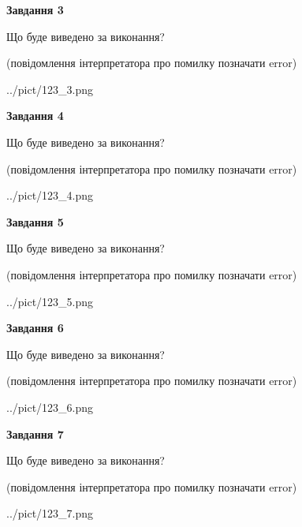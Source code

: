 \documentclass[12pt, ukrainian]{article}
\begin{document}
{\begin {large}
{\begin {center}\textbf{Завдання 3}\end {center}}\par
Що буде виведено за виконання?\par
 (повідомлення інтерпретатора про помилку позначати error)\par
\begin{center}
	{../pict/123_3.png}
\end{center}
\newpage

{\begin {center}\textbf{Завдання 4}\end {center}}\par
Що буде виведено за виконання?\par
 (повідомлення інтерпретатора про помилку позначати error)\par
\begin{center}
	{../pict/123_4.png}
\end{center}
\newpage

{\begin {center}\textbf{Завдання 5}\end {center}}\par
Що буде виведено за виконання?\par
 (повідомлення інтерпретатора про помилку позначати error)\par
\begin{center}
	{../pict/123_5.png}
\end{center}
\newpage

{\begin {center}\textbf{Завдання 6}\end {center}}\par
Що буде виведено за виконання?\par
 (повідомлення інтерпретатора про помилку позначати error)\par
\begin{center}
	{../pict/123_6.png}
\end{center}
\newpage

{\begin {center}\textbf{Завдання 7}\end {center}}\par
Що буде виведено за виконання?\par
 (повідомлення інтерпретатора про помилку позначати error)\par
\begin{center}
	{../pict/123_7.png}
\end{center}
\newpage


\end{large}}
\end{document}
